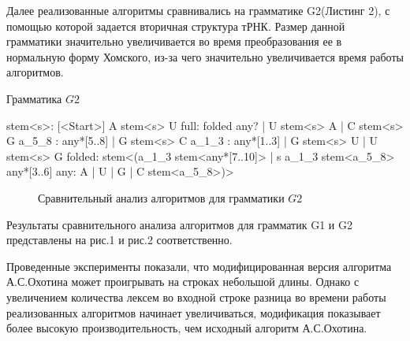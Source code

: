 \documentclass[14pt]{matmex-diploma}
\begin{document}
Далее реализованные алгоритмы сравнивались на грамматике G2\linebreak(Листинг 2), с помощью которой задается вторичная структура тРНК. Размер данной грамматики значительно увеличивается во время преобразования ее в нормальную форму Хомского, из-за чего значительно увеличивается время работы алгоритмов.


\begin{listing}[h]
\caption{Грамматика $G2$}
\begin{pyglist}[]

stem<s>:             [<Start>]       
      A stem<s> U    full: folded any?
    | U stem<s> A          
    | C stem<s> G       a_5_8 : any*[5..8]
    | G stem<s> C       a_1_3 : any*[1..3]
    | G stem<s> U
    | U stem<s> G       folded: stem<(a_1_3 stem<any*[7..10]> 
    | s                               a_1_3 stem<a_5_8> 
                                      any*[3..6] 
any: A | U | G | C                    stem<a_5_8>)> 

\end{pyglist}
\end{listing}

\begin{figure}[h]
\centering
{}
\caption{Сравнительный анализ алгоритмов для грамматики $G2$}
\end{figure}

Результаты сравнительного анализа алгоритмов для грамматик G1 и G2 представлены на рис.1 и рис.2 соответственно.

Проведенные эксперименты показали, что модифицированная версия алгоритма А.С.Охотина может проигрывать на строках небольшой длины. Однако с увеличением количества лексем во входной строке разница во времени работы реализованных алгоритмов начинает увеличиваться, модификация показывает более высокую производительность, чем исходный алгоритм А.С.Охотина.
\end{document}
